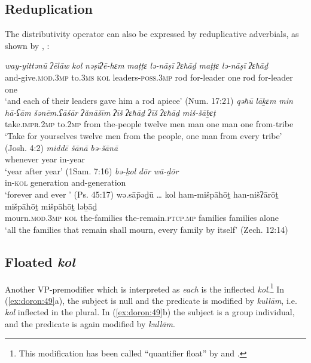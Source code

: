 \documentclass[output=paper]{langsci/langscibook}
\begin{document}
\subsection{Reduplication}%
The distributivity operator can also be expressed by reduplicative adverbials, as shown by \citet{BeckStechow2006}, \citet{NaudeMillerNaude2015}:

\ea%
    \label{ex:doron:48}
    \ea
    \gll \textit{way-yittənū}             \textit{ʔēlāw}   \textit{kol}  \textit{nəṣīʔē-hɛm}           \textit{maṭṭɛ} \textit{lə-nāṣī}      \textit{ʔɛħāḏ} \textit{maṭṭɛ} \textit{lə-nāṣī}    \textit{ʔɛħāḏ}\\
         and-give.\textsc{mod.3mp}  to.\textsc{3ms}  \textsc{kol} leaders-\textsc{poss.3mp} rod  for-leader one    rod   for-leader one\\
    \glt `and each of their leaders gave him a rod apiece' (Num. 17:21)
    \ex
    \gll \textit{qəħū}                  \textit{lāḵɛm}  \textit{min}   \textit{hā-ʕām}      \textit{šənēm.ʕāśār} \textit{ʔănāšīm} \textit{ʔīš}    \textit{ʔɛħāḏ}  \textit{ʔīš}    \textit{ʔɛħāḏ}  \textit{miš-šāḇɛṭ}\\
         take.\textsc{impr.2mp}  to.2\textsc{mp} from the-people twelve           men       man one      man one    from-tribe\\
    \glt `Take for yourselves twelve men from the people, one man from every tribe' (Josh. 4:2)
    \ex
    \gll \textit{middē}       \textit{šānā}  \textit{bə-šānā}\\
         whenever year  in-year \\
    \glt `year after year' (1Sam. 7:16)
    \ex
    \gll \textit{bə-ḵol}  \textit{dōr}             \textit{wā-ḏōr}\\
         in-\textsc{kol} generation and-generation     \\
    \glt `forever and ever ' (Ps. 45:17)
    \ex
    \gll wə.sā\={p}əḏū …       kol  ham-mišpāħōṯ  han-nišʔārōṯ             mišpāħōṯ mišpāħōṯ ləḇāḏ\\
         mourn.\textsc{mod.3mp} {}  \textsc{kol} the-families     the-remain.\textsc{ptcp.mp}  families families   alone   \\
    \glt `all the families that remain shall mourn, every family by itself' (Zech. 12:14)
    \z
\z

\subsection{Floated \textit{kol}}%
Another VP-premodifier which is interpreted as \textit{each} is the inflected \textit{kol}.\footnote{This modification has been called “quantifier float” by \citet{Shlonsky1991} and \cite{Naudé2011interpretation}.} In (\ref{ex:doron:49}a), the subject is null and the predicate is modified by \textit{kullām}, i.e. \textit{kol} inflected in the plural. In (\ref{ex:doron:49}b) the subject is a group individual, and the predicate is again modified by \textit{kullām}.
\end{document}

